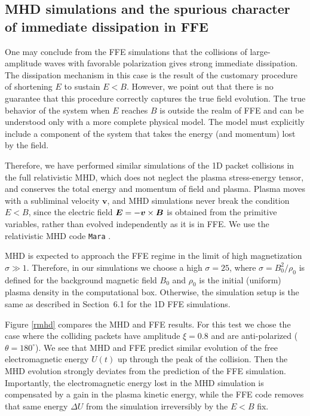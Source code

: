 \subsection{MHD simulations and the spurious character of immediate dissipation in FFE}
%
One may conclude from the FFE simulations that the collisions of large-amplitude \alfven waves with favorable polarization 
gives strong immediate dissipation. The dissipation mechanism in this case is the result of the customary procedure of shortening $E$ to sustain $E<B$. 
However, we point out that there is no guarantee that this procedure correctly captures the true field evolution. 
The true behavior of the system when $E$ reaches $B$ is outside the realm of FFE and can be understood only with a more complete physical model. The model must explicitly include a component of the system that takes the energy (and momentum) lost by the field.

Therefore, we have performed similar simulations of the 1D packet collisions in the full relativistic MHD, which does not neglect the plasma stress-energy tensor, and conserves the total energy and momentum of field and plasma. Plasma moves with a subliminal velocity $\boldsymbol{v}$, and MHD simulations never break the condition $E<B$, since the electric field $\boldsymbol{E} = -\boldsymbol{v} \times \boldsymbol{B}$ is obtained from the primitive variables, rather than evolved independently as it is in FFE. We use the relativistic MHD code \texttt{Mara} \citep{2012ApJ...744...32Z}.

MHD is expected to approach the FFE regime in the limit of high magnetization $\sigma\gg 1$. Therefore, in our simulations we choose a high $\sigma=25$, where $\sigma=B_0^2/\rho_0$ is defined for the background magnetic field $B_0$ and $\rho_0$ is the initial (uniform) plasma density in the computational box. 
Otherwise, the simulation setup is the same as described in Section~6.1 for the 1D FFE simulations.

Figure \ref{rmhd} compares the MHD and FFE results. For this test we chose the case where the colliding packets have amplitude $\xi=0.8$ and are anti-polarized ($\theta=180^\circ$).
We see that MHD and FFE predict similar evolution of the free electromagnetic energy $U(t)$ up through the peak of the collision. 
Then the MHD evolution strongly deviates from the prediction of the FFE simulation.
Importantly, the electromagnetic energy lost in the MHD simulation is compensated by a gain in the plasma kinetic energy, while the FFE code removes that same energy $\Delta U$ from the simulation irreversibly by the $E < B$ fix. 


